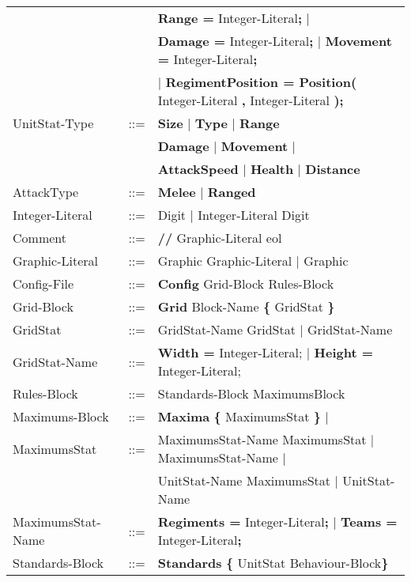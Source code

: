 \begin{center}
\begin{longtable}{l l l}
								   &	     & {\bf  Range =} Integer-Literal{\bf;} $\mid$ \\
								   &	     & {\bf Damage =} Integer-Literal{\bf ;} $\mid$ {\bf Movement = }Integer-Literal{\bf ;} \\				  
								   &		 & $\mid$ {\bf RegimentPosition = Position(} Integer-Literal {\bf ,} Integer-Literal {\bf );}\\
				UnitStat-Type	   &	::=	 & {\bf Size} $\mid$ {\bf Type} $\mid$ {\bf  Range} \\
								   &	     & {\bf Damage} $\mid$ {\bf Movement } $\mid$ \\
								   &		 & {\bf AttackSpeed} $\mid$ {\bf Health} $\mid$ {\bf Distance}\\
				AttackType		   &    ::=  & {\bf Melee} $\mid$ {\bf Ranged} \\
				Integer-Literal    &	::=  & Digit $\mid$ Integer-Literal Digit \\
				Comment			   &	::=	 & {\bf //} Graphic-Literal eol \\
				Graphic-Literal	   &	::=	 & Graphic Graphic-Literal $\mid$ Graphic \\
				Config-File		   & 	::=  & {\bf Config} Grid-Block Rules-Block  		\\
				Grid-Block		   &	::=	 & {\bf Grid} Block-Name	 {\bf \{} GridStat \bf{\}} \\
				GridStat		   &	::=  & GridStat-Name GridStat $\mid$ GridStat-Name   \\
				GridStat-Name	   &	::=  & {\bf Width = } Integer-Literal; $\mid$ {\bf Height = } Integer-Literal; \\

				Rules-Block		   &	::=	 & Standards-Block MaximumsBlock 				\\
				Maximums-Block	   &	::=	 & {\bf Maxima} {\bf \{} MaximumsStat {\bf \}} $\mid$ \\
				MaximumsStat	   &	::=  & MaximumsStat-Name MaximumsStat $\mid$ MaximumsStat-Name $\mid$		\\
								   &	     & UnitStat-Name MaximumsStat $\mid$ UnitStat-Name			\\
				MaximumsStat-Name  &	::=  & {\bf Regiments = } Integer-Literal{\bf ;} $\mid$ {\bf Teams = } Integer-Literal{\bf ;} \\
				Standards-Block	   &    ::=  & {\bf Standards} {\bf \{ } UnitStat Behaviour-Block\bf{\} }		\\
				\end{longtable}
		\end{center}
		
